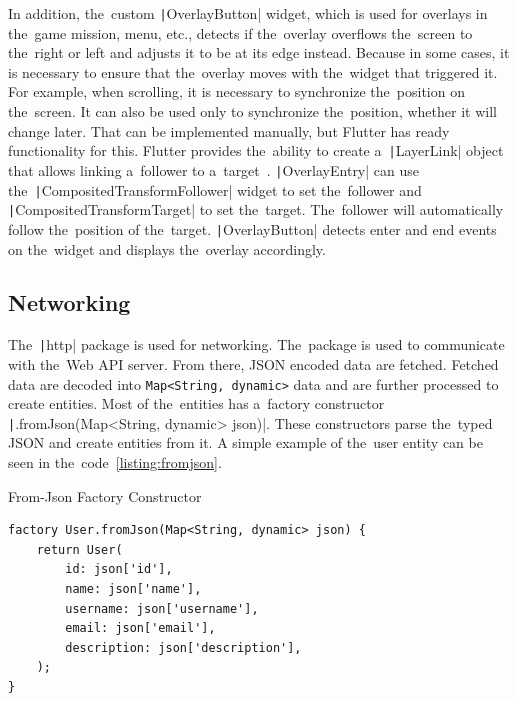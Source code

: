In addition, the~custom \texttt|OverlayButton| widget, which is used for overlays in the~game mission, menu, etc., detects if the~overlay overflows the~screen to the~right or left and adjusts it to be at its edge instead.
Because in some cases, it is necessary to ensure that the~overlay moves with the~widget that triggered it.
For example, when scrolling, it is necessary to synchronize the~position on the~screen.
It can also be used only to synchronize the~position, whether it will change later.
That can be implemented manually, but Flutter has ready functionality for this.
Flutter provides the~ability to create a~\texttt|LayerLink| object that allows linking a~follower to a~target~\cite{a2022_material}.
\texttt|OverlayEntry| can use the~\texttt|CompositedTransformFollower| widget to set the~follower and \texttt|CompositedTransformTarget| to set the~target.
The~follower will automatically follow the~position of the~target.
\texttt|OverlayButton| detects enter and end events on the~widget and displays the~overlay accordingly.

\subsection{Networking}

The~\texttt|http| package is used for networking.
The~package is used to communicate with the~Web API server.
From there, JSON encoded data are fetched.
Fetched data are decoded into \texttt{Map<String, dynamic>} data and are further processed to create entities.
Most of the~entities has a~factory constructor \texttt|.fromJson(Map<String, dynamic> json)|.
These constructors parse the~typed JSON and create entities from it.
A simple example of the~user entity can be seen in the~code~\ref{listing:fromjson}.

\begin{listing}
    \caption{From-Json Factory Constructor}
    \label{listing:fromjson}
    \begin{verbatim}
factory User.fromJson(Map<String, dynamic> json) {
    return User(
        id: json['id'],
        name: json['name'],
        username: json['username'],
        email: json['email'],
        description: json['description'],
    );
}
    \end{verbatim}
\end{listing}

